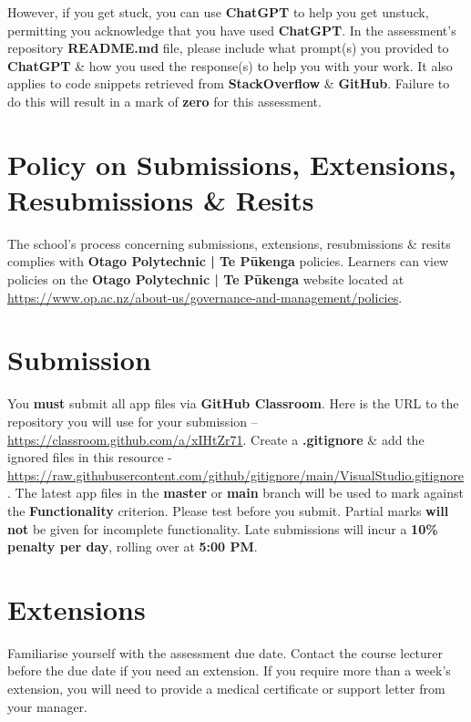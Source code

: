 \documentclass{article}
\begin{document}
 However, if you get stuck, you can use \textbf{ChatGPT} to help you get unstuck, permitting you acknowledge that you have used \textbf{ChatGPT}. In the assessment's repository \textbf{README.md} file, please include what prompt(s) you provided to \textbf{ChatGPT} \& how you used the response(s) to help you with your work. It also applies to code snippets retrieved from \textbf{StackOverflow} \& \textbf{GitHub}. Failure to do this will result in a mark of \textbf{zero} for this assessment.

\section*{Policy on Submissions, Extensions, Resubmissions \& Resits}
The school's process concerning submissions, extensions, resubmissions \& resits complies with \textbf{Otago Polytechnic | Te Pūkenga} policies. Learners can view policies on the \textbf{Otago Polytechnic | Te Pūkenga} website located at \href{https://www.op.ac.nz/about-us/governance-and-management/policies}{https://www.op.ac.nz/about-us/governance-and-management/policies}.

\section*{Submission}
You \textbf{must} submit all app files via \textbf{GitHub Classroom}. Here is the URL to the repository you will use for your submission – \href{https://classroom.github.com/a/xIHtZr71}{https://classroom.github.com/a/xIHtZr71}.  Create a \textbf{.gitignore} \& add the ignored files in this resource - \href{https://raw.githubusercontent.com/github/gitignore/main/VisualStudio.gitignore}{https://raw.githubusercontent.com/github/gitignore/main/VisualStudio.gitignore}. The latest app files in the \textbf{master} or \textbf{main} branch will be used to mark against the \textbf{Functionality} criterion. Please test before you submit. Partial marks \textbf{will not} be given for incomplete functionality. Late submissions will incur a \textbf{10\% penalty per day}, rolling over at \textbf{5:00 PM}.

\section*{Extensions}
Familiarise yourself with the assessment due date. Contact the course lecturer before the due date if you need an extension. If you require more than a week's extension, you will need to provide a medical certificate or support letter from your manager.
\end{document}
